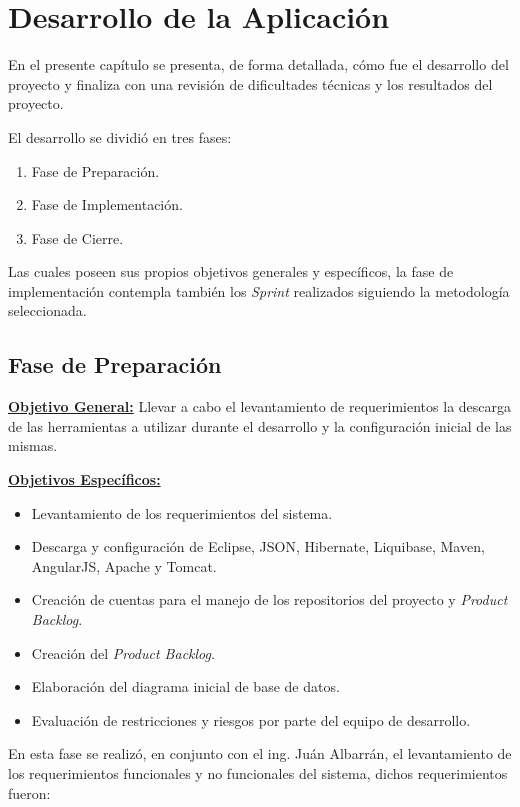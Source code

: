 \chapter{Desarrollo de la Aplicación}

En el presente capítulo se presenta, de forma detallada, cómo fue el desarrollo del proyecto y finaliza con una revisión de dificultades técnicas y los resultados del proyecto.

El desarrollo se dividió en tres fases:

\begin{enumerate}
    \item Fase de Preparación.    
    \item Fase de Implementación.
    \item Fase de Cierre.
\end{enumerate}

Las cuales poseen sus propios objetivos generales y específicos, la fase de implementación contempla también los \textit{Sprint} realizados siguiendo la metodología seleccionada.

\section{Fase de Preparación}
    
    \textbf{\underline{Objetivo General:}}
    Llevar a cabo el levantamiento de requerimientos la descarga de las herramientas a utilizar durante el desarrollo y la configuración inicial de las mismas.
    
    \textbf{\underline{Objetivos Específicos:}}
    \begin{itemize}
        \item Levantamiento de los requerimientos del sistema.
        \item Descarga y configuración de Eclipse, JSON, Hibernate, Liquibase, Maven, AngularJS, Apache y Tomcat.
        \item Creación de cuentas para el manejo de los repositorios del proyecto y \textit{Product Backlog}.
        \item Creación del \textit{Product Backlog}.
        \item Elaboración del diagrama inicial de base de datos. %
        \item Evaluación de restricciones y riesgos por parte del equipo de desarrollo.
    \end{itemize}
    
    En esta fase se realizó, en conjunto con el ing. Juán Albarrán, el levantamiento de los requerimientos funcionales y no funcionales del sistema, dichos requerimientos fueron:
    
